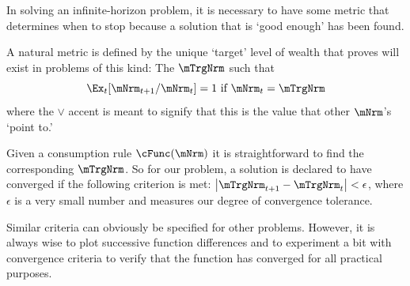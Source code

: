 \documentclass[titlepage, headings=optiontotocandhead]{\econtex}
\begin{document}
In solving an infinite-horizon problem, it is necessary to have some
metric that determines when to stop because a solution that is `good
enough' has been found.

A natural metric is defined by the unique `target' level of wealth that \cite{BufferStockTheory} proves
will exist in problems of this kind: The $\mTrgNrm$ such that
\begin{equation}
  \Ex_t [{\mNrm}_{t+1}/\mNrm_t] = 1 \mbox{~if~} \mNrm_t = \mTrgNrm  \label{eq:mTrgNrmet}
\end{equation}
where the $\vee$ accent is meant to signify that this is the value
that other $\mNrm$'s `point to.'

Given a consumption rule $\cFunc(\mNrm)$ it is straightforward to find
the corresponding $\mTrgNrm$.  So for our problem, a solution is declared
to have converged if the following criterion is met:
$\left|\mTrgNrm_{t+1}-\mTrgNrm_{t}\right| < \epsilon$, where $\epsilon$ is
a very small number and measures our degree of convergence tolerance.

Similar criteria can obviously be specified for other problems.
However, it is always wise to plot successive function differences and
to experiment a bit with convergence criteria to verify that the
function has converged for all practical purposes.
\end{document}
